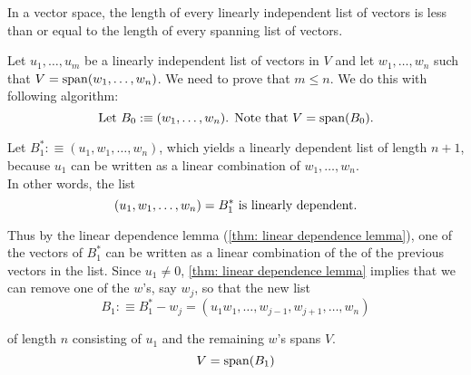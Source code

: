 \setcounter{thm}{21}
\begin{thm}  
  \label{thm: length of linearly dependent list less or equal to length of spanning list}
  In a \fd vector space, the length of every linearly independent list of vectors is less than or equal to the length of every spanning list of vectors.
\end{thm}
\begin{prf}
  Let $u_1, \ldots, u_m$ be a linearly independent list of vectors in $V$ and let $w_1, \ldots, w_n$ such that $V=\operatorname{span} (w_1, \ldots, w_n)$. We need to prove that $m \leq n$. We do this with following algorithm:
  \begin{equation*}
      $Let $B_0 :\equiv  (w_1, \ldots, w_n)$. Note that $V=\myspan{B_0}.
  \end{equation*}

   Let $B_1^* :\equiv (u_1, w_1, \ldots, w_n)$, which yields a linearly dependent list of length $n+1$, because $u_1$ can be written as a linear combination of $w_1, \ldots, w_n$. \\
  In other words, the list
  \begin{equation*}
    (u_1, w_1, \ldots, w_n) = B_1^* $ is linearly dependent.$
  \end{equation*}

  Thus by the linear dependence lemma (\ref{thm: linear dependence lemma}), one of the vectors of $B_1^*$ can be written as a linear combination of the of the previous vectors in the list. Since $u_1 \neq 0$, \ref{thm: linear dependence lemma} implies that we can remove one of the $w$'s, say $w_j$, so that the new list
  \begin{equation*}
    B_1 :\equiv B_1^* - {w_j} = (u_1 w_1, \ldots, w_{j-1}, w_{j+1}, \ldots, w_n)
  \end{equation*}

  of length $n$ consisting of $u_1$ and the remaining $w$'s spans $V$.
  \begin{equation*}
    V=\operatorname{span} (B_1)
  \end{equation*}


\end{prf}
